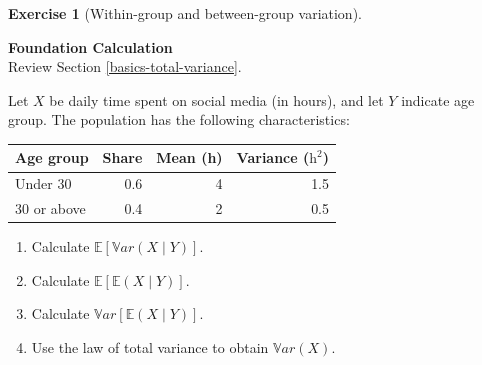 \documentclass[
  11pt,
]{book}
\providecommand{\tightlist}{%
  \setlength{\itemsep}{0pt}\setlength{\parskip}{0pt}}
\theoremstyle{definition}
\theoremstyle{definition}
\theoremstyle{definition}
\newtheorem{exercise}{Exercise}[chapter]
\theoremstyle{definition}
\theoremstyle{remark}
\begin{document}

\begin{exercisebox}

\begin{exercise}[Within-group and between-group variation]
\protect\hypertarget{exr:basics-total-variance}{}\label{exr:basics-total-variance}

\textbf{Foundation \textbar{} Calculation}\\
Review Section \ref{basics-total-variance}.

Let \(X\) be daily time spent on social media (in hours), and let \(Y\) indicate age group. The population has the following characteristics:

\begin{longtable}[]{@{}lrrr@{}}
\toprule\noalign{}
Age group & Share & Mean (h) & Variance (\(\mathrm{h}^2\)) \\
\midrule\noalign{}
\endhead
\bottomrule\noalign{}
\endlastfoot
Under 30 & 0.6 & 4 & 1.5 \\
30 or above & 0.4 & 2 & 0.5 \\
\end{longtable}

\begin{enumerate}
\def\labelenumi{\arabic{enumi}.}
\tightlist
\item
  Calculate \(\mathbb{E}[\mathbb{V}ar(X\mid Y)]\).
\item
  Calculate \(\mathbb{E}[\mathbb{E}(X\mid Y)]\).
\item
  Calculate \(\mathbb{V}ar[\mathbb{E}(X\mid Y)]\).
\item
  Use the law of total variance to obtain \(\mathbb{V}ar(X)\).
\end{enumerate}

\end{exercise}

\end{exercisebox}

\end{document}
